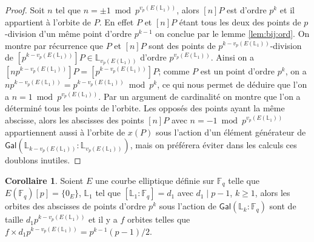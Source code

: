 \documentclass[10pt,a4paper]{book}
\theoremstyle{plain}
\theoremstyle{definition}
\theoremstyle{definition}
\theoremstyle{definition}
\newtheorem{cor}[thm]{Corollaire}
\theoremstyle{definition}
\theoremstyle{definition}
\theoremstyle{remark}
\theoremstyle{remark}
\theoremstyle{definition}
\begin{document}
\begin{proof}
Soit $n$ tel que $n= \pm 1 \bmod p^{v_p({E(\mathbb{L}_1)})}$, alors $[n]P$ est 
d'ordre $p^k$ et il appartient à l'orbite de $P$. En effet $P$ et 
$[n]P$ étant tous les deux des points de $p$-division d'un même point d'ordre 
$p^{k-1}$ on conclue par le lemme \ref{lem:bij:ord}. On montre par récurrence que $P$ et 
$[n]P$ sont des points de $p^{k-v_p({E(\mathbb{L}_1)})}$-division de 
$[p^{k-v_p({E(\mathbb{L}_1)})}]P \in \mathbb{L}_{v_p({E(\mathbb{L}_1)})}$ 
d'ordre $p^{v_p(E(\mathbb{L}_1))}$. Ainsi on a $[np^{k-v_p(E(\mathbb{L}_1))}]P=
[p^{k-v_p(E(\mathbb{L}_1))}]P$; comme $P$ est un point d'ordre $p^k$, on a 
$np^{k-v_p(E(\mathbb{L}_1))}=p^{k-v_p(E(\mathbb{L}_1))} \bmod p^k$, ce qui nous 
permet de déduire que l'on a $n=1 \bmod p^{v_p(E(\mathbb{L}_1))}$. Par un 
argument de cardinalité on montre que l'on a déterminé tous les points de 
l'orbite. Les opposés des points ayant la même abscisse, alors les abscisses 
des points $[n]P$ avec $n=-1 \bmod p^{v_p(E(\mathbb{L}_1))}$ appartiennent 
aussi à l'orbite de $x(P)$ sous l'action d'un élément générateur de 
$\mathsf{Gal}(\mathbb{L}_{k-v_p(E(\mathbb{L}_1))}:
\mathbb{L}_{v_p(E(\mathbb{L}_1))})$, mais on préférera éviter dans les calculs 
ces doublons inutiles.
\end{proof}

\begin{cor}
\label{cor:orb:fro} 
Soient $E$ une courbe elliptique définie sur $\mathbb{F}_q$ telle que \newline
$E(\mathbb{F}_q)[p] =\{0_E\} $, $\mathbb{L}_1$ tel que $[\mathbb{L}_1:
\mathbb{F}_q]=d_1$ avec $d_1 \mid p-1$, $k \geqslant 1$, alors les orbites des 
abscisses de points d'ordre $p^k$ sous l'action de $\mathsf{Gal}
(\mathbb{L}_{k}:\mathbb{F}_q)$ sont de taille $d_1 p^{k-v_p(E(\mathbb{L}_1))}$ 
et il y a $f$ orbites telles que $f \times d_1 p^{k-v_p(E(\mathbb{L}_1))} = 
p^{k-1}(p-1)/2$.
\end{cor}

\end{document}
